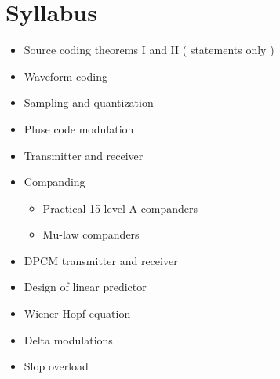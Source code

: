 \documentclass[../course]{subfiles}
\begin{document}
\section{Syllabus}

\begin{itemize}

  \item Source coding theorems I and II ( statements only )
  \item Waveform coding
  \item Sampling and quantization
  \item Pluse code modulation
  \item Transmitter and receiver
  \item Companding

      \begin{itemize}
          \item Practical 15 level A companders
          \item Mu-law companders
      \end{itemize}

  \item DPCM transmitter and receiver
  \item Design of linear predictor
  \item Wiener-Hopf equation
  \item Delta modulations
  \item Slop overload

\end{itemize}
\end{document}
